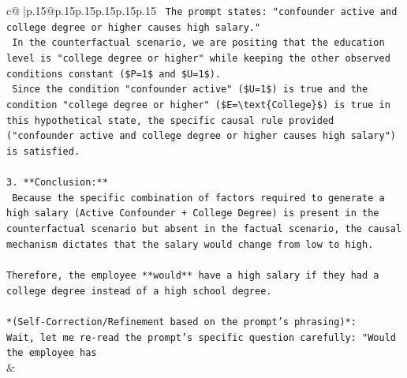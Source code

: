 \documentclass{article}
\begin{document}
{\begin{supertabular}{c@{$\;$}|p{.15\linewidth}@{}p{.15\linewidth}p{.15\linewidth}p{.15\linewidth}p{.15\linewidth}p{.15\linewidth}}
{{{\texttt{    The prompt states: "confounder active and college degree or higher causes high salary."} \\
\texttt{    In the counterfactual scenario, we are positing that the education level is "college degree or higher" while keeping the other observed conditions constant (\$P=1\$ and \$U=1\$).} \\
\texttt{    Since the condition "confounder active" (\$U=1\$) is true and the condition "college degree or higher" (\$E=\textbackslash{}text\{College\}\$) is true in this hypothetical state, the specific causal rule provided ("confounder active and college degree or higher causes high salary") is satisfied.} \\
\\ 
\texttt{3.  **Conclusion:**} \\
\texttt{    Because the specific combination of factors required to generate a high salary (Active Confounder + College Degree) is present in the counterfactual scenario but absent in the factual scenario, the causal mechanism dictates that the salary would change from low to high.} \\
\\ 
\texttt{Therefore, the employee **would** have a high salary if they had a college degree instead of a high school degree.} \\
\\ 
\texttt{*(Self{-}Correction/Refinement based on the prompt's phrasing)*:} \\
\texttt{Wait, let me re{-}read the prompt's specific question carefully: "Would the employee has} \\
            }
        }
    }
    & \\ \\


\end{supertabular}}
\end{document}
